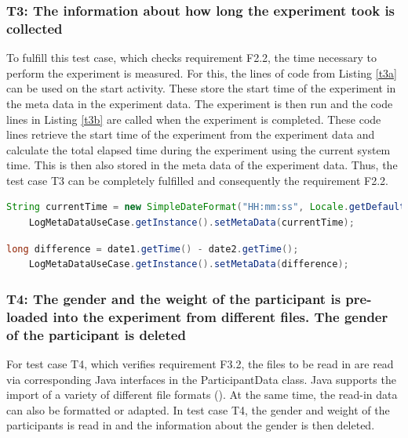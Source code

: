 \newpage

\subsubsection*{T3: The information about how long the experiment took is collected}

To fulfill this test case, which checks requirement F2.2, the time necessary to perform the experiment is measured. For this, the lines of code from Listing \ref{t3a} can be used on the start activity. These store the start time of the experiment in the meta data in the experiment data. The experiment is then run and the code lines in Listing \ref{t3b} are called when the experiment is completed. These code lines retrieve the start time of the experiment from the experiment data and calculate the total elapsed time during the experiment using the current system time. This is then also stored in the meta data of the experiment data. Thus, the test case T3 can be completely fulfilled and consequently the requirement F2.2.


\begin{lstlisting}[language=java,label=t3a,lineskip={0pt}, caption=Collect time needed to conduct experiment (a), basicstyle=\scriptsize, captionpos=b]
    String currentTime = new SimpleDateFormat("HH:mm:ss", Locale.getDefault()).format(new Date());
    LogMetaDataUseCase.getInstance().setMetaData(currentTime);
\end{lstlisting}

\begin{lstlisting}[language=java,label=t3b,lineskip={0pt}, caption=Collect time needed to conduct experiment (b), basicstyle=\scriptsize, captionpos=b]
    long difference = date1.getTime() - date2.getTime();
    LogMetaDataUseCase.getInstance().setMetaData(difference);
\end{lstlisting}

\newpage

\subsubsection*{T4: The gender and the weight of the participant is pre-loaded into the experiment from different files. The gender of the participant is deleted}

For test case T4, which verifies requirement F3.2, the files to be read in are read via corresponding Java interfaces in the ParticipantData class. Java supports the import of a variety of different file formats (\cite{Ullenboom.2017}). At the same time, the read-in data can also be formatted or adapted. In test case T4, the gender and weight of the participants is read in and the information about the gender is then deleted.


